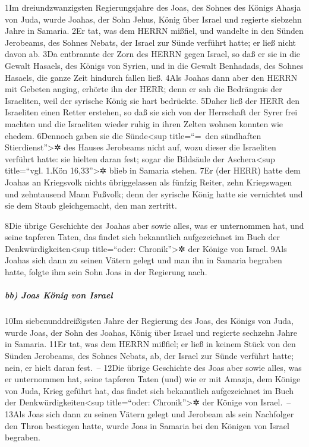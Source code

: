 1Im dreiundzwanzigsten Regierungsjahre des Joas, des Sohnes des Königs
Ahasja von Juda, wurde Joahas, der Sohn Jehus, König über Israel und
regierte siebzehn Jahre in Samaria. 2Er tat, was dem HERRN mißfiel, und
wandelte in den Sünden Jerobeams, des Sohnes Nebats, der Israel zur
Sünde verführt hatte; er ließ nicht davon ab. 3Da entbrannte der Zorn
des HERRN gegen Israel, so daß er sie in die Gewalt Hasaels, des Königs
von Syrien, und in die Gewalt Benhadads, des Sohnes Hasaels, die ganze
Zeit hindurch fallen ließ. 4Als Joahas dann aber den HERRN mit Gebeten
anging, erhörte ihn der HERR; denn er sah die Bedrängnis der Israeliten,
weil der syrische König sie hart bedrückte. 5Daher ließ der HERR den
Israeliten einen Retter erstehen, so daß sie sich von der Herrschaft der
Syrer frei machten und die Israeliten wieder ruhig in ihren Zelten
wohnen konnten wie ehedem. 6Dennoch gaben sie die Sünde\textless sup
title=``=~den sündhaften Stierdienst''\textgreater✲ des Hauses Jerobeams
nicht auf, wozu dieser die Israeliten verführt hatte: sie hielten daran
fest; sogar die Bildsäule der Aschera\textless sup title=``vgl. 1.Kön
16,33''\textgreater✲ blieb in Samaria stehen. 7Er (der HERR) hatte dem
Joahas an Kriegsvolk nichts übriggelassen als fünfzig Reiter, zehn
Kriegswagen und zehntausend Mann Fußvolk; denn der syrische König hatte
sie vernichtet und sie dem Staub gleichgemacht, den man zertritt.

8Die übrige Geschichte des Joahas aber sowie alles, was er unternommen
hat, und seine tapferen Taten, das findet sich bekanntlich aufgezeichnet
im Buch der Denkwürdigkeiten\textless sup title=``oder:
Chronik''\textgreater✲ der Könige von Israel. 9Als Joahas sich dann zu
seinen Vätern gelegt und man ihn in Samaria begraben hatte, folgte ihm
sein Sohn Joas in der Regierung nach.

\hypertarget{bb-joas-kuxf6nig-von-israel}{%
\subparagraph{bb) Joas König von
Israel}\label{bb-joas-kuxf6nig-von-israel}}

10Im siebenunddreißigsten Jahre der Regierung des Joas, des Königs von
Juda, wurde Joas, der Sohn des Joahas, König über Israel und regierte
sechzehn Jahre in Samaria. 11Er tat, was dem HERRN mißfiel; er ließ in
keinem Stück von den Sünden Jerobeams, des Sohnes Nebats, ab, der Israel
zur Sünde verführt hatte; nein, er hielt daran fest.~-- 12Die übrige
Geschichte des Joas aber sowie alles, was er unternommen hat, seine
tapferen Taten (und) wie er mit Amazja, dem Könige von Juda, Krieg
geführt hat, das findet sich bekanntlich aufgezeichnet im Buch der
Denkwürdigkeiten\textless sup title=``oder: Chronik''\textgreater✲ der
Könige von Israel.~-- 13Als Joas sich dann zu seinen Vätern gelegt und
Jerobeam als sein Nachfolger den Thron bestiegen hatte, wurde Joas in
Samaria bei den Königen von Israel begraben.

